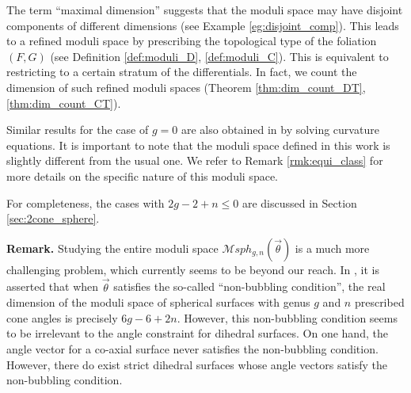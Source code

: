 \documentclass[pdflatex,sn-mathphys]{sn-jnl}%
\numberwithin{equation}{section}
\theoremstyle{thmstyleone}%
\newcommand{\Msphgn}{\mathcal{M}sph_{g,n}(\vec{\theta})}
\begin{document}
The term ``maximal dimension'' suggests that the moduli space may have disjoint components of different dimensions (see Example \ref{eg:disjoint_comp}).
This leads to a refined moduli space by prescribing the topological type of the foliation $(F,G)$ (see Definition \ref{def:moduli_D}, \ref{def:moduli_C}). This is equivalent to restricting to a certain stratum of the differentials. In fact, we count the dimension of such refined moduli spaces (Theorem \ref{thm:dim_count_DT}, \ref{thm:dim_count_CT}).

Similar results for the case of $g=0$ are also obtained in \cite{CLY22axv} by solving curvature equations. It is important to note that the moduli space defined in this work is slightly different from the usual one. We refer to Remark \ref{rmk:equi_class} for more details on the specific nature of this moduli space.

For completeness, the cases with $2g-2+n\leq0$ are discussed in Section \ref{sec:2cone_sphere}.

\medskip
\textbf{Remark.} Studying the entire moduli space $\Msphgn$ is a much more challenging problem, which currently seems to be beyond our reach. In \cite[Section 6]{MonPa19}, it is asserted that when $\vec{\theta}$ satisfies the so-called “non-bubbling condition”, the real dimension of the moduli space of spherical surfaces with genus $g$ and $n$ prescribed cone angles is precisely $6g - 6 + 2n$. However, this non-bubbling condition seems to be irrelevant to the angle constraint for dihedral surfaces. On one hand, the angle vector for a co-axial surface never satisfies the non-bubbling condition. However, there do exist strict dihedral surfaces whose angle vectors satisfy
the non-bubbling condition.



\end{document}
